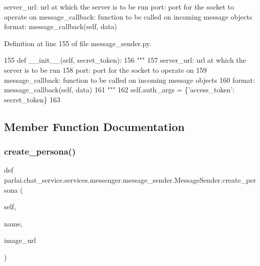\begin{DoxyVerb}server_url:           url at which the server is to be run
port:                 port for the socket to operate on
message_callback:     function to be called on incoming message objects
              format: message_callback(self, data)
\end{DoxyVerb}
 

Definition at line 155 of file message\+\_\+sender.\+py.


\begin{DoxyCode}
155     \textcolor{keyword}{def }\_\_init\_\_(self, secret\_token):
156         \textcolor{stringliteral}{"""}
157 \textcolor{stringliteral}{        server\_url:           url at which the server is to be run}
158 \textcolor{stringliteral}{        port:                 port for the socket to operate on}
159 \textcolor{stringliteral}{        message\_callback:     function to be called on incoming message objects}
160 \textcolor{stringliteral}{                              format: message\_callback(self, data)}
161 \textcolor{stringliteral}{        """}
162         self.auth\_args = \{\textcolor{stringliteral}{'access\_token'}: secret\_token\}
163 
\end{DoxyCode}


\subsection{Member Function Documentation}
\mbox{\label{classparlai_1_1chat__service_1_1services_1_1messenger_1_1message__sender_1_1MessageSender_abd0bb6dbaec08355b16c4df8e9e72e2f}} 
\subsubsection{\texorpdfstring{create\+\_\+persona()}{create\_persona()}}
{\footnotesize\ttfamily def parlai.\+chat\+\_\+service.\+services.\+messenger.\+message\+\_\+sender.\+Message\+Sender.\+create\+\_\+persona (\begin{DoxyParamCaption}\item[{}]{self,  }\item[{}]{name,  }\item[{}]{image\+\_\+url }\end{DoxyParamCaption})}

